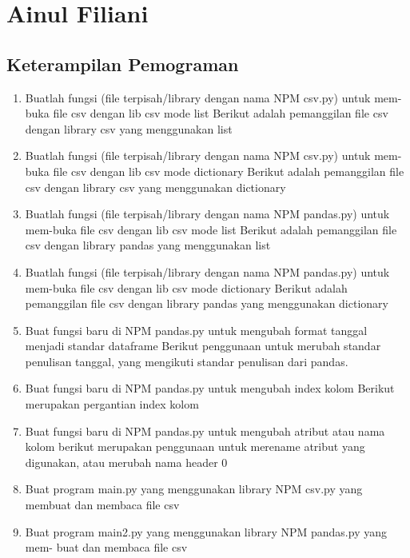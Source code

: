 
\section{Ainul Filiani}

\subsection{Keterampilan Pemograman}

\begin{enumerate}

\item Buatlah fungsi (file terpisah/library dengan nama NPM csv.py) untuk mem-buka file csv dengan lib csv mode list
Berikut adalah pemanggilan file csv dengan library csv yang menggunakan list

\item Buatlah fungsi (file terpisah/library dengan nama NPM csv.py) untuk mem-buka file csv dengan lib csv mode dictionary Berikut adalah pemanggilan file csv dengan library csv yang menggunakan dictionary

\item Buatlah fungsi (file terpisah/library dengan nama NPM pandas.py) untuk mem-buka file csv dengan lib csv mode list Berikut adalah pemanggilan file csv dengan library pandas yang menggunakan list

\item Buatlah fungsi (file terpisah/library dengan nama NPM pandas.py) untuk mem-buka file csv dengan lib csv mode dictionary Berikut adalah pemanggilan file csv dengan library pandas yang menggunakan dictionary

\item Buat fungsi baru di NPM pandas.py untuk mengubah format tanggal menjadi standar dataframe
Berikut penggunaan untuk merubah standar penulisan tanggal, yang mengikuti standar penulisan dari pandas.

\item Buat fungsi baru di NPM pandas.py untuk mengubah index kolom
Berikut merupakan pergantian index kolom

\item Buat fungsi baru di NPM pandas.py untuk mengubah atribut atau nama kolom berikut merupakan penggunaan untuk merename atribut yang digunakan, atau merubah nama header 0

\item Buat program main.py yang menggunakan library NPM csv.py yang membuat dan membaca 
file csv

\item Buat program main2.py yang menggunakan library NPM pandas.py yang mem- buat dan membaca 
file csv



\end{enumerate}
